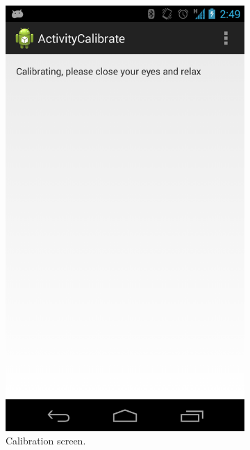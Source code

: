 \documentclass[a4paper,10pt,english,lof,lot,twoside]{puthesis}
\begin{document}
\begin{figure}
\begin{subfigure}[t]{0.30\linewidth}
\includegraphics[width=0.800\linewidth]{early-prototype-screen-calibrate.png}
\caption[Calibration screen]{Calibration screen.}\label{ch-design/index:fig-early-prototype-screen-calibrate}\end{subfigure}
\begin{subfigure}[t]{0.30\linewidth}
\centering
\capstart


\end{subfigure}
\end{figure}
\end{document}

